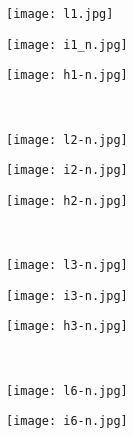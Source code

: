 \documentclass[letterpaper]{article} %
\begin{document}
\begin{figure}[t!]
	\begin{subfigure}[b]{.33\linewidth}
		\centering
		\texttt{[image: l1.jpg]}
	\end{subfigure}%
	\begin{subfigure}[b]{.33\linewidth}
		\centering
		\texttt{[image: i1\_n.jpg]}
	\end{subfigure}%
	\begin{subfigure}[b]{.33\linewidth}
		\centering
		\texttt{[image: h1-n.jpg]}
	\end{subfigure}%
	\vspace{3pt}\\
	\begin{subfigure}[b]{.33\linewidth}
		\centering
		\texttt{[image: l2-n.jpg]}
	\end{subfigure}%
	\begin{subfigure}[b]{.33\linewidth}
		\centering
		\texttt{[image: i2-n.jpg]}
	\end{subfigure}%
	\begin{subfigure}[b]{.33\linewidth}
		\centering
		\texttt{[image: h2-n.jpg]}
	\end{subfigure}%
	\vspace{3pt}\\
	\begin{subfigure}[b]{.33\linewidth}
		\centering
		\texttt{[image: l3-n.jpg]}
	\end{subfigure}%
	\begin{subfigure}[b]{.33\linewidth}
		\centering
		\texttt{[image: i3-n.jpg]}
	\end{subfigure}%
	\begin{subfigure}[b]{.33\linewidth}
		\centering
		\texttt{[image: h3-n.jpg]}
	\end{subfigure}%
	\vspace{3pt}\\
	\begin{subfigure}[b]{.33\linewidth}
		\centering
		\texttt{[image: l6-n.jpg]}
	\end{subfigure}%
	\begin{subfigure}[b]{.33\linewidth}
		\centering
		\texttt{[image: i6-n.jpg]}
	\end{subfigure}%
	\begin{subfigure}[b]{.33\linewidth}
		\centering

\end{subfigure}
\end{figure}
\end{document}
